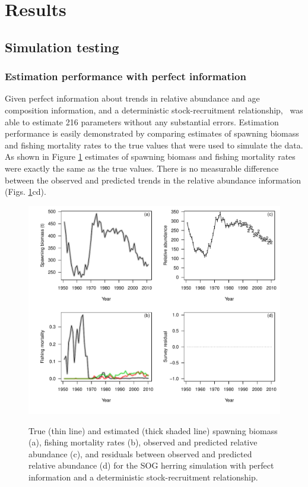 \section{Results}
	\subsection{Simulation testing}
		\subsubsection{Estimation performance with perfect information}
	
	Given perfect information about trends in relative abundance and age composition information, and a deterministic stock-recruitment relationship, \iscam\ was able to estimate 216 parameters without any substantial errors.	  Estimation performance is easily demonstrated by comparing estimates of spawning biomass and fishing mortality rates to the true values that were used to simulate the data.  As shown in Figure \ref{FigSimPlot} estimates of spawning biomass and fishing mortality rates were exactly the same as the true values. There is no measurable difference between the observed and predicted trends in the relative abundance information (Figs. \ref{FigSimPlot}cd).
	
\begin{figure}[!tbp]
	\includegraphics[width=\textwidth]{../Figs/simPlot.pdf}\\
	\caption{True (thin line) and estimated (thick shaded line) spawning biomass (a), fishing mortality rates (b), observed and predicted relative abundance (c), and residuals between observed and predicted relative abundance (d) for the SOG herring simulation with perfect information and a deterministic stock-recruitment relationship.}\label{FigSimPlot}
\end{figure}
		

